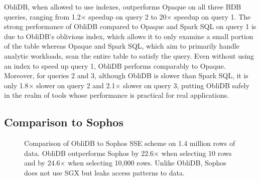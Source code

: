 \documentclass[letterpaper,twocolumn,10pt]{article}
\newcommand{\ignore}[1]{}
\def\name/{ObliDB}
\begin{document}
\name/, when allowed to use indexes, outperforms Opaque on all three BDB queries, ranging from 1.2$\times$ speedup on query 2 to 20$\times$ speedup on query 1. The strong performance of \name/ compared to Opaque and Spark SQL on query 1 is due to \name/'s oblivious index, which allows it to only examine a small portion of the table whereas Opaque and Spark SQL, which aim to primarily handle analytic workloads, scan the entire table to satisfy the query. Even without using an index to speed up query 1, \name/ performs comparably to Opaque. Moreover, for queries 2 and 3, although \name/ is slower than Spark SQL, it is only 1.8$\times$ slower on query 2 and 2.1$\times$ slower on query 3, putting \name/ safely in the realm of tools whose performance is practical for real applications.

\subsection{Comparison to Sophos}
\begin{figure}
\small
\centering
{}
\caption{Comparison of \name/ to Sophos SSE scheme\cite{Bost16} on 1.4 million rows of data. \name/ outperforms Sophos by 22.6$\times$ when selecting 10 rows and by 24.6$\times$ when selecting 10,000 rows. Unlike \name/, Sophos does not use SGX but leaks access patterns to data.\ignore{make sure to mention in text that sophos numbers come from original paper and were gathered on a more powerful computer and also used multithreading. Also, if we extrapolate the Sophos numbers to 100k rows retrieved, \name/ linear scan beats both \name/ index and sophos}}
\label{figSophos}
\end{figure}
\end{document}
